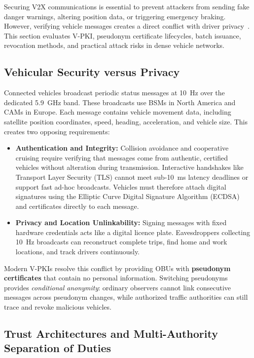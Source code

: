 Securing V2X communications is essential to prevent attackers from sending fake danger warnings, altering position data, or triggering emergency braking.
However, verifying vehicle messages creates a direct conflict with driver privacy~\cite{brecht2018scms}.
This section evaluates V-PKI, pseudonym certificate lifecycles, batch issuance, revocation methods, and practical attack risks in dense vehicle networks.

\subsection{Vehicular Security versus Privacy}
\label{subsec:security_privacy_dilemma}

Connected vehicles broadcast periodic status messages at 10~Hz over the dedicated 5.9~GHz band.
These broadcasts use BSMs in North America and CAMs in Europe.
Each message contains vehicle movement data, including satellite position coordinates, speed, heading, acceleration, and vehicle size.
This creates two opposing requirements:
\begin{itemize}
    \item \textbf{Authentication and Integrity:} Collision avoidance and cooperative cruising require verifying that messages come from authentic, certified vehicles without alteration during transmission.
    Interactive handshakes like Transport Layer Security (TLS) cannot meet sub-10~ms latency deadlines or support fast ad-hoc broadcasts.
    Vehicles must therefore attach digital signatures using the Elliptic Curve Digital Signature Algorithm (ECDSA) and certificates directly to each message.
    \item \textbf{Privacy and Location Unlinkability:} Signing messages with fixed hardware credentials acts like a digital licence plate.
    Eavesdroppers collecting 10~Hz broadcasts can reconstruct complete trips, find home and work locations, and track drivers continuously.
\end{itemize}
Modern V-PKIs resolve this conflict by providing OBUs with \textbf{pseudonym certificates} that contain no personal information.
Switching pseudonyms provides \textit{conditional anonymity}: ordinary observers cannot link consecutive messages across pseudonym changes, while authorized traffic authorities can still trace and revoke malicious vehicles.

\subsection{Trust Architectures and Multi-Authority Separation of Duties}
\label{subsec:trust_architectures}

